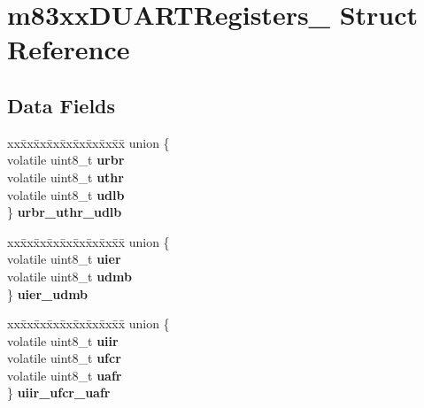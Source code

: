 \hypertarget{structm83xxDUARTRegisters__}{}\section{m83xx\+D\+U\+A\+R\+T\+Registers\+\_\+ Struct Reference}
\label{structm83xxDUARTRegisters__}
\subsection*{Data Fields}
\begin{DoxyCompactItemize}
\item 
\mbox{\label{structm83xxDUARTRegisters___aa842346432bba2b5b9442258887b77f1}} 
\begin{tabbing}
xx\=xx\=xx\=xx\=xx\=xx\=xx\=xx\=xx\=\kill
union \{\\
\>volatile uint8\_t {\bfseries urbr}\\
\>volatile uint8\_t {\bfseries uthr}\\
\>volatile uint8\_t {\bfseries udlb}\\
\} {\bfseries urbr\_uthr\_udlb}\\

\end{tabbing}\item 
\mbox{\label{structm83xxDUARTRegisters___aa24327c67a4ebfddab7c166f5a5002a5}} 
\begin{tabbing}
xx\=xx\=xx\=xx\=xx\=xx\=xx\=xx\=xx\=\kill
union \{\\
\>volatile uint8\_t {\bfseries uier}\\
\>volatile uint8\_t {\bfseries udmb}\\
\} {\bfseries uier\_udmb}\\

\end{tabbing}\item 
\mbox{\label{structm83xxDUARTRegisters___abe6521eb2ce5487cc74e2d728eee3b38}} 
\begin{tabbing}
xx\=xx\=xx\=xx\=xx\=xx\=xx\=xx\=xx\=\kill
union \{\\
\>volatile uint8\_t {\bfseries uiir}\\
\>volatile uint8\_t {\bfseries ufcr}\\
\>volatile uint8\_t {\bfseries uafr}\\
\} {\bfseries uiir\_ufcr\_uafr}\\


\end{tabbing}
\end{DoxyCompactItemize}
